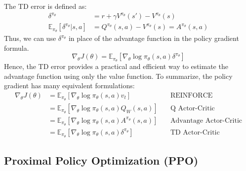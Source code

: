 The TD error is defined as:
\begin{equation}
  \begin{aligned}
    \delta^{\pi_\theta} &= r+ \gamma V^{\pi_\theta}(s') - V^{\pi_\theta}(s) \\
    \mathbb{E}_{\pi_\theta}[\delta^{\pi_\theta}|s, a] &= Q^{\pi_\theta}(s, a) - V^{\pi_\theta}(s) = A^{\pi_\theta}(s, a)
  \end{aligned}
\end{equation}
Thus, we can use $\delta^{\pi_\theta}$ in place of the advantage function in the policy gradient formula.
\begin{equation}
  \nabla_\theta J(\theta) = \mathbb{E}_{\pi_\theta} [\nabla_\theta \log \pi_\theta(s, a) \delta^{\pi_\theta}]
\end{equation}
Hence, the TD error provides a practical and efficient way to estimate the advantage function using only the value function.
To summarize, the policy gradient has many equivalent formulations:
\begin{equation}
  \begin{aligned}
    \nabla_\theta J(\theta)
    &= \mathbb{E}_{\pi_\theta}[\nabla_\theta \log \pi_\theta(s, a) v_t] &\quad \text{REINFORCE} \\
    &= \mathbb{E}_{\pi_\theta}[\nabla_\theta \log \pi_\theta(s, a) Q_W(s, a)] &\quad \text{Q Actor-Critic} \\
    &= \mathbb{E}_{\pi_\theta}[\nabla_\theta \log \pi_\theta(s, a) A^{\pi_\theta}(s, a)] &\quad \text{Advantage Actor-Critic} \\
    &= \mathbb{E}_{\pi_\theta}[\nabla_\theta \log \pi_\theta(s, a) \delta^{\pi_\theta}] &\quad \text{TD Actor-Critic}
  \end{aligned}
\end{equation}

\subsection{Proximal Policy Optimization (PPO)}


